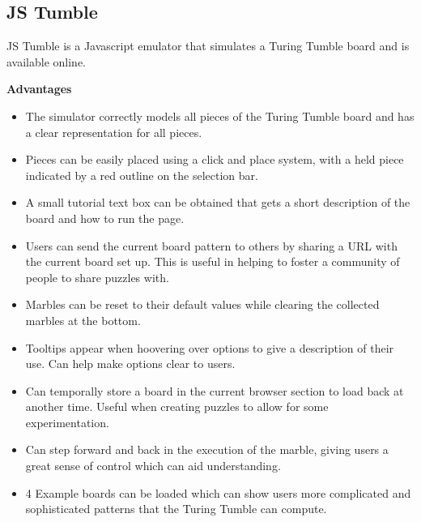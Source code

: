 \documentclass{l4proj}
\begin{document}
\subsection{JS Tumble}
JS Tumble is a Javascript emulator that simulates a Turing Tumble board and is available online.

\textbf{Advantages}
\begin{itemize}
    \item The simulator correctly models all pieces of the Turing Tumble board and has a clear representation for all pieces.
    \item Pieces can be easily placed using a click and place system, with a held piece indicated by a red outline on the selection bar.
    \item A small tutorial text box can be obtained that gets a short description of the board and how to run the page.
    \item Users can send the current board pattern to others by sharing a URL with the current board set up. This is useful in helping to foster a community of people to share puzzles with.
    \item Marbles can be reset to their default values while clearing the collected marbles at the bottom.
    \item Tooltips appear when hoovering over options to give a description of their use. Can help make options clear to users.
    \item Can temporally store a board in the current browser section to load back at another time. Useful when creating puzzles to allow for some experimentation.
    \item Can step forward and back in the execution of the marble, giving users a great sense of control which can aid understanding.
    \item 4 Example boards can be loaded which can show users more complicated and sophisticated patterns that the Turing Tumble can compute. 
\end{itemize}
\end{document}
